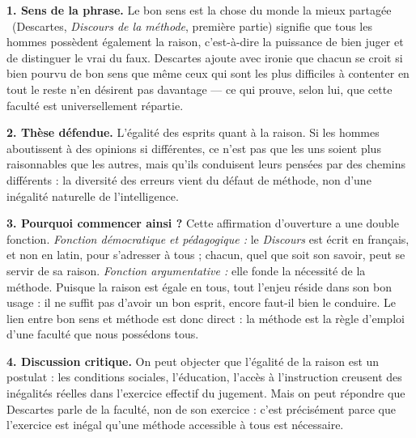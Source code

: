 \documentclass[11pt]{article}
\newcommand{\cle}[1]{{\popxbold\color{popdark}#1}}
\begin{document}
\begin{corrige}
\textbf{1. Sens de la phrase.} \guillemotleft Le bon sens est la chose du monde la mieux partagée \guillemotright\ (Descartes, \emph{Discours de la méthode}, première partie) signifie que tous les hommes possèdent \cle{également} la raison, c'est-à-dire la puissance de bien juger et de distinguer le vrai du faux. Descartes ajoute avec \cle{ironie} que chacun se croit si bien pourvu de bon sens que même ceux qui sont les plus difficiles à contenter en tout le reste n'en désirent pas davantage — ce qui prouve, selon lui, que cette faculté est \cle{universellement répartie}.

\textbf{2. Thèse défendue.} L'\cle{égalité des esprits} quant à la raison. Si les hommes aboutissent à des opinions si différentes, ce n'est pas que les uns soient plus raisonnables que les autres, mais qu'ils \cle{conduisent leurs pensées par des chemins différents} : la diversité des erreurs vient du \cle{défaut de méthode}, non d'une inégalité naturelle de l'intelligence.

\textbf{3. Pourquoi commencer ainsi ?} Cette affirmation d'ouverture a une double fonction. \emph{Fonction démocratique et pédagogique :} le \emph{Discours} est écrit en français, et non en latin, pour s'adresser à tous ; chacun, quel que soit son savoir, peut se servir de sa raison. \emph{Fonction argumentative :} elle fonde la \cle{nécessité de la méthode}. Puisque la raison est égale en tous, tout l'enjeu réside dans son bon usage : il ne suffit pas d'avoir un bon esprit, encore faut-il \cle{bien le conduire}. Le lien entre bon sens et méthode est donc direct : la méthode est la \cle{règle d'emploi} d'une faculté que nous possédons tous.

\textbf{4. Discussion critique.} On peut objecter que l'égalité de la raison est un \cle{postulat} : les conditions sociales, l'éducation, l'accès à l'instruction creusent des inégalités réelles dans l'exercice effectif du jugement. Mais on peut répondre que Descartes parle de la \cle{faculté}, non de son exercice : c'est précisément parce que l'exercice est inégal qu'une méthode accessible à tous est nécessaire.
\end{corrige}
\end{document}
